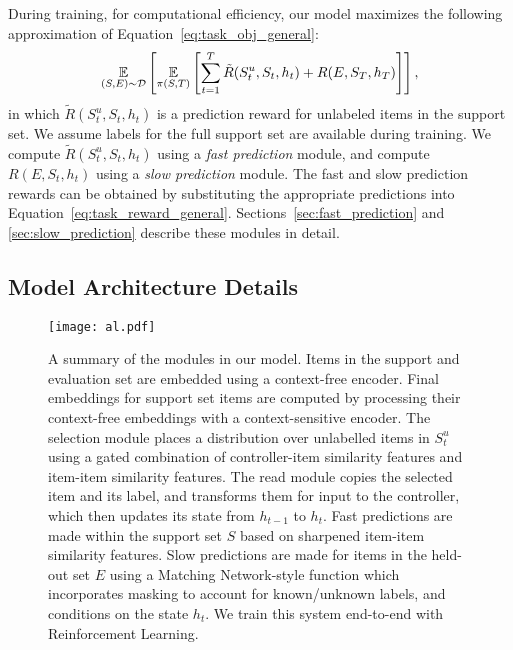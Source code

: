 During training, for computational efficiency, our model maximizes the following approximation of Equation~\ref{eq:task_obj_general}:
\begin{align}
\operatorname*{\mathbb{E}}_{(S, E) \sim \mathcal{D}} \left[  \operatorname*{\mathbb{E}}_{\pi(S, T)} \left[ \sum_{t=1}^{T} \tilde{R}(S^u_t, S_t, h_t) + R(E, S_T, h_T) \right] \right],
\label{eq:task_obj_training}
\end{align}
in which $\tilde{R}(S^u_t, S_t, h_t)$ is a prediction reward for unlabeled items in the support set. We assume labels for the full support set are available during training.
We compute $\tilde{R}(S^u_t, S_t, h_t)$ using a \emph{fast prediction} module, and compute $R(E, S_t, h_t)$ using a \emph{slow prediction} module.
The fast and slow prediction rewards can be obtained by substituting the appropriate predictions into Equation~\ref{eq:task_reward_general}.
Sections~\ref{sec:fast_prediction} and \ref{sec:slow_prediction} describe these modules in detail. 


\subsection{Model Architecture Details}
\label{sec:model_architecture}

\begin{figure*}[t]
\centering
\texttt{[image: al.pdf]}
\caption{A summary of the modules in our model. Items in the support and evaluation set are embedded using a context-free encoder. Final embeddings for support set items are computed by processing their context-free embeddings with a context-sensitive encoder. The selection module places a distribution over unlabelled items in $S^u_t$ using a gated combination of controller-item similarity features and item-item similarity features. The read module copies the selected item and its label, and transforms them for input to the controller, which then updates its state from $h_{t-1}$ to $h_{t}$. Fast predictions are made within the support set $S$ based on sharpened item-item similarity features. Slow predictions are made for items in the held-out set $E$ using a Matching Network-style function which incorporates masking to account for known/unknown labels, and conditions on the state $h_t$. We train this system end-to-end with Reinforcement Learning.}
\label{fig:model_diagrams}
\vspace{-0.5cm}
\end{figure*}

